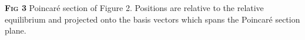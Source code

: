 \color{black}
{\footnotesize
\textbf{\textsc{Fig 3}} Poincar\'e section of Figure 2. Positions are 
relative to the relative equilibrium and projected onto the basis vectors which
spans the Poincar\'e section plane.}
